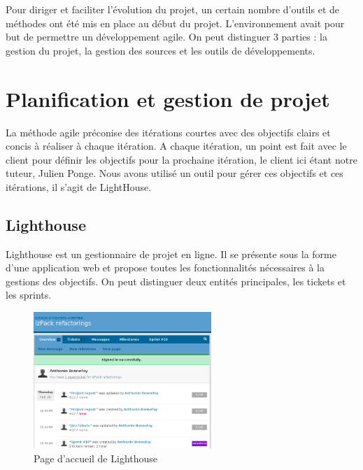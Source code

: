 Pour diriger et faciliter l'évolution du projet, un certain nombre d'outils et de méthodes ont été mis en place au début du projet.
L'environnement avait pour but de permettre un développement agile.
On peut distinguer 3 parties : la gestion du projet, la gestion des sources et les outils de développements.
\section{Planification et gestion de projet}
La méthode agile préconise des itérations courtes avec des objectifs clairs et concis à réaliser à chaque itération.
A chaque itération, un point est fait avec le client pour définir les objectifs pour la prochaine itération, le client ici étant notre tuteur, Julien Ponge.
Nous avons utilisé un outil pour gérer ces objectifs et ces itérations, il s'agit de LightHouse.
\subsection{Lighthouse}
Lighthouse est un gestionnaire de projet en ligne.
Il se présente sous la forme d'une application web et propose toutes les fonctionnalités nécessaires à la gestions des objectifs.
On peut distinguer deux entités principales, les tickets et les sprints.
\begin{figure}[H]
	\centering
	\includegraphics[width=0.6\textwidth]{../image/lighthouse.png}
	\caption{Page d'accueil de Lighthouse}
\end{figure}
